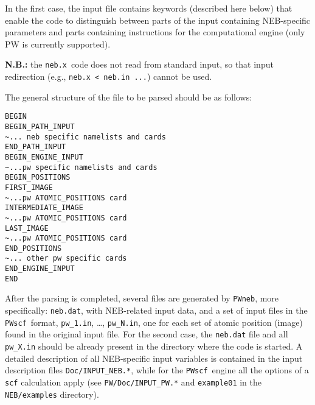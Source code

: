 \documentclass[12pt,a4paper]{article}
\def\NEB{\texttt{PWneb}} %
\def\nebx{\texttt{neb.x}}
\def\PWscf{\texttt{PWscf}}
\begin{document}
In the first case, the input file contains keywords (described here below) 
that enable the code to distinguish between parts of the input containing 
NEB-specific parameters and parts containing instructions for the 
computational engine (only PW is currently supported).

\noindent\textbf{N.B.:} the \nebx\ code does not read from standard input,
so that input redirection (e.g., \texttt{neb.x < neb.in ...}) cannot be used.

The general structure of the file to be parsed should be as follows:
\begin{verbatim}
BEGIN
BEGIN_PATH_INPUT
~... neb specific namelists and cards
END_PATH_INPUT
BEGIN_ENGINE_INPUT
~...pw specific namelists and cards
BEGIN_POSITIONS
FIRST_IMAGE
~...pw ATOMIC_POSITIONS card
INTERMEDIATE_IMAGE
~...pw ATOMIC_POSITIONS card
LAST_IMAGE
~...pw ATOMIC_POSITIONS card
END_POSITIONS
~... other pw specific cards
END_ENGINE_INPUT
END
\end{verbatim}

After the parsing is completed, several files are generated by \NEB, more 
specifically: \texttt{neb.dat}, with NEB-related input data, 
and a set of input files in the \PWscf\ format, \texttt{pw\_1.in}, \ldots,
\texttt{pw\_N.in}, one for each set of atomic position (image) found in 
the original input file.
For the second case, the \texttt{neb.dat} file and all \texttt{pw\_X.in} 
should be already present in the directory where the code is started.
A detailed description of all NEB-specific input variables is contained 
in the input description files \texttt{Doc/INPUT\_NEB.*}, while for the
\PWscf\ engine all the options of a \texttt{scf} calculation apply (see
\texttt{PW/Doc/INPUT\_PW.*} and \texttt{example01} in the 
\texttt{NEB/examples} directory). 
\end{document}
